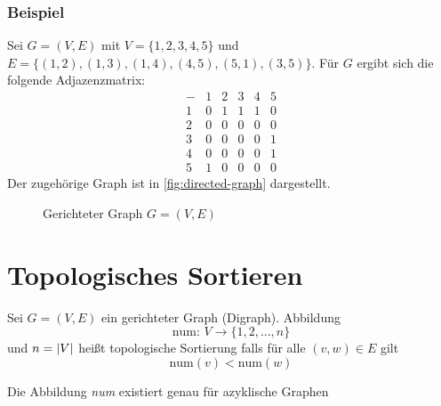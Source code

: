             \subsubsection{Beispiel}
                Sei $G = (V, E)$ mit $V= \{1,2,3,4,5\}$ und $E=\{(1,2),(1,3),(1,4),(4,5),(5,1),(3,5)\}$. Für $G$ ergibt sich die folgende Adjazenzmatrix:
                $$
                    \begin{array}{c|ccccc}
                    - & 1 & 2 & 3 & 4 & 5 \\ 
                    \hline
                    1 & 0 & 1 & 1 & 1 & 0 \\ 
                    2 & 0 & 0 & 0 & 0 & 0 \\ 
                    3 & 0 & 0 & 0 & 0 & 1 \\ 
                    4 & 0 & 0 & 0 & 0 & 1 \\ 
                    5 & 1 & 0 & 0 & 0 & 0
                    \end{array} 
                $$
                Der zugehörige Graph ist in \autoref{fig:directed-graph} dargestellt.
                \begin{figure}[htp]
                    \capstart
                    \centering
                    
                    \caption{Gerichteter Graph $G = (V, E)$}
                    \label{fig:directed-graph}
                \end{figure}      

            \section{Topologisches Sortieren}
                Sei $G=(V,E)$ ein gerichteter Graph (Digraph). Abbildung 
                $$
                    \text{num: } V \rightarrow \{1,2,...,n \}
                $$
                und $n= \lvert V\rvert$ heißt topologische Sortierung falls für alle $(v,w) \in E$ gilt
                $$
                    \text{num}(v) < \text{num}(w)
                $$
                \begin{satz}
                    Die Abbildung \emph{num} existiert genau für azyklische Graphen
                \end{satz}
                
